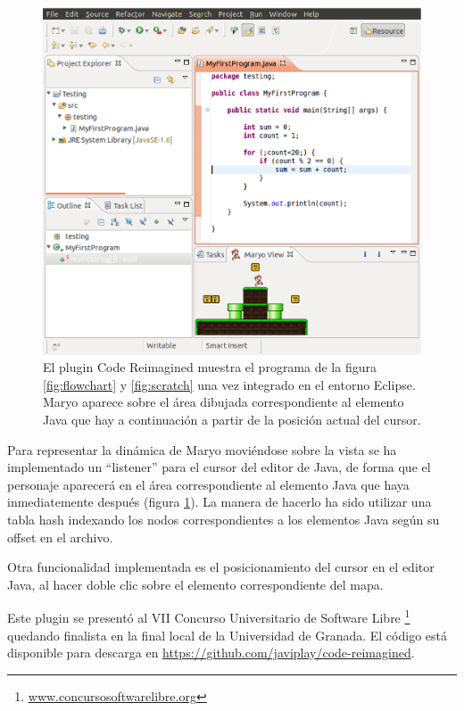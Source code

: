 \documentclass{llncs}
\begin{document}
\begin{figure}[ht]
\begin{center}
\includegraphics[scale=0.4]{images/eclipse.eps}
\caption{El plugin Code Reimagined muestra el programa de la figura \ref{fig:flowchart} y \ref{fig:scratch} una vez integrado en el entorno Eclipse. Maryo aparece sobre el área dibujada correspondiente al elemento Java que hay a continuación a partir de la posición actual del cursor.
\label{fig:eclipse}}
\end{center}
\end{figure}

Para representar la dinámica de Maryo moviéndose sobre la vista se ha implementado un ``listener'' para el cursor del editor de Java, de forma que el personaje aparecerá en el área correspondiente al elemento Java que haya inmediatemente después (figura \ref{fig:eclipse}). La manera de hacerlo ha sido utilizar una tabla hash indexando los nodos correspondientes a los elementos Java según su offset en el archivo.

Otra funcionalidad implementada es el posicionamiento del cursor en el editor Java, al hacer doble clic sobre el elemento correspondiente del mapa.

Este plugin se presentó al VII Concurso Universitario de Software Libre \footnote{\url{www.concursosoftwarelibre.org}} quedando finalista en la final local de la Universidad de Granada. El código está disponible para descarga en \url{https://github.com/javiplay/code-reimagined}.
\end{document}
